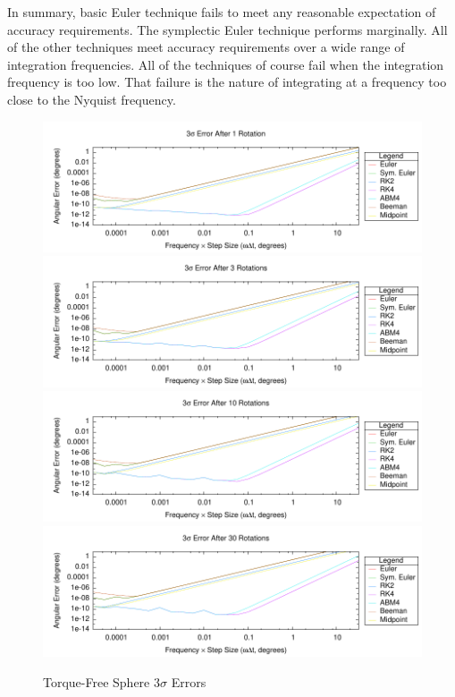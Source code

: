 \begin{description}
In summary, basic Euler technique fails to meet any reasonable expectation
of accuracy requirements. The symplectic Euler technique performs marginally.
All of the other techniques meet accuracy requirements over a wide range
of integration frequencies. All of the techniques of course fail when the
integration frequency is too low. That failure is the nature of integrating
at a frequency too close to the Nyquist frequency.



\begin{figure}[hbtp]
\centering
\includegraphics{figures/plot_RotationTestTorqueFreeSphere_revs_1_monte_err}
\vspace{2.0ex}
\includegraphics{figures/plot_RotationTestTorqueFreeSphere_revs_3_monte_err}
\vspace{2.0ex}
\includegraphics{figures/plot_RotationTestTorqueFreeSphere_revs_10_monte_err}
\vspace{2.0ex}
\includegraphics{figures/plot_RotationTestTorqueFreeSphere_revs_30_monte_err}
\caption{Torque-Free Sphere 3$\sigma$ Errors}
\label{fig:ffsphere_err}
\end{figure} 



\end{description}
